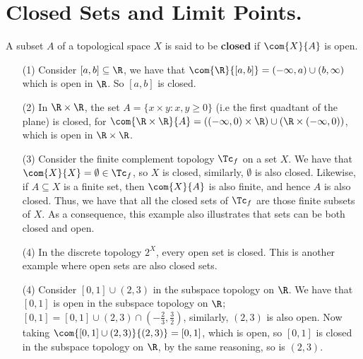 
\section{Closed Sets and Limit Points.}

\begin{definition}
    A subset $A$ of a topological space  $X$ is said to be  \textbf{closed} if
    $\com{X}{A}$ is open.
\end{definition}

\begin{example}
    \begin{enumerate}
        \item[(1)] Consider $[a,b] \subseteq \R$, we have that
            $\com{\R}{[a,b]}=(-\infty,a) \cup (b, \infty)$ which is open in
            $\R$. So  $[a,b]$ is closed.

        \item[(2)] In  $\R \times \R$, the set  $A=\{x \times y: x,y \geq 0\}$  (i.e
            the first quadtant of the plane) is closed, for $\com{\R \times
            \R}{A}=((- \infty,0) \times \R) \cup (\R \times (-\infty,0))$, which
            is open in $\R \times \R$.

        \item[(3)] Consider the finite complement topology $\Tc_f$ on a set  $X$. We
            have that  $\com{X}{X}=\emptyset \in \Tc_f$, so  $X$ is closed,
            similarly,  $\emptyset$ is also closed. Likewise, if  $A \subseteq
            X$ is a finite set, then  $\com{X}{A}$ is also finite, and hence $A$
            is also closed. Thus, we have that all the closed sets of  $\Tc_f$
            are those finite subsets of  $X$. As a consequence, this example also
            illustrates that sets can be both closed and open.

        \item[(4)] In the discrete topology  $2^X$, every open set is closed. This is
            another example where open sets are also closed sets.

        \item[(4)] Consider  $[0,1] \cup (2,3)$ in the subspace topology on $\R$. We
            have that  $[0,1]$ is open in the subspace topology on $\R$;
            $[0,1]=[0,1] \cup (2,3) \cap (-\frac{2}{3},\frac{3}{2})$, similarly,
            $(2,3)$ is also open. Now taking  $\com{[0,1] \cup
            (2,3)}{(2,3)}=[0,1]$, which is open, so $[0,1]$ is closed in the
            subspace topology on  $\R$, by the same reasoning, so is  $(2,3)$.
    \end{enumerate}
\end{example}

